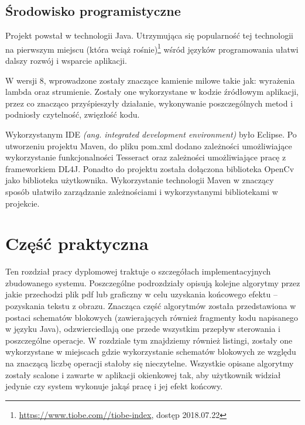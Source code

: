 \documentclass[a4paper,12pt]{article}
\newcommand\spacingIndent{2.2em}
\begin{document}
	\subsection{Środowisko programistyczne}
		\hspace{\spacingIndent} Projekt powstał w technologii Java. Utrzymująca się popularność tej technologii na pierwszym miejscu 
			(która wciąż rośnie)\footnote{\href{https://www.tiobe.com//tiobe-index}{\url{https://www.tiobe.com//tiobe-index}}, dostęp 2018.07.22} 
			wśród języków programowania ułatwi dalszy rozwój i wsparcie aplikacji. 
		
		 W wersji 8, wprowadzone zostały znaczące kamienie milowe takie jak: wyrażenia lambda oraz strumienie. Zostały one wykorzystane 
			w kodzie źródłowym aplikacji, przez co znacząco przyśpieszyły działanie, wykonywanie poszczególnych metod i podniosły czytelność, zwięzłość kodu. 
        
		Wykorzystanym IDE \textit{(ang. integrated development environment)} było Eclipse. Po utworzeniu projektu Maven, do pliku pom.xml 
			dodano zależności umożliwiające wykorzystanie funkcjonalności Tesseract oraz zależności umożliwiające pracę z frameworkiem DL4J. 
			Ponadto do projektu została dołączona biblioteka OpenCv jako biblioteka użytkownika. Wykorzystanie technologii Maven 
			w znaczący sposób ułatwiło zarządzanie zależnościami i wykorzystanymi bibliotekami w projekcie.
        \newpage
        
\section{Część praktyczna}
    \hspace{\spacingIndent} Ten rozdział pracy dyplomowej traktuje o szczegółach implementacyjnych zbudowanego systemu. Poszczególne podrozdziały opisują kolejne algorytmy przez jakie przechodzi plik pdf lub graficzny w celu uzyskania końcowego efektu -- pozyskania tekstu z obrazu. Znacząca część algorytmów została przedstawiona w postaci schematów blokowych (zawierających również fragmenty kodu napisanego w języku Java), odzwierciedlają one przede wszystkim przepływ sterowania i poszczególne operacje. W rozdziale tym znajdziemy również listingi, zostały one wykorzystane w miejscach gdzie wykorzystanie schematów blokowych ze względu na znaczącą liczbę operacji stałoby się nieczytelne. Wszystkie opisane algorytmy zostały scalone i zawarte w aplikacji okienkowej tak, aby użytkownik widział jedynie czy system wykonuje jakąś pracę i jej efekt końcowy.
    
\end{document}
